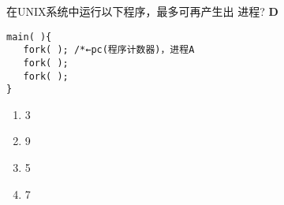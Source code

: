 \begin{problem}
	在UNIX系统中运行以下程序，最多可再产生出 \myline 进程?
	\textbf{D}
	\begin{lstlisting}
main( ){
   fork( ); /*←pc(程序计数器)，进程A
   fork( );
   fork( );
}
	\end{lstlisting}
	\vspace{-0.5em}
	\begin{multicols}{4}
		\begin{enumerate}[label=\Alph*.]
			\item 3
			\item 9
			\item 5
			\item 7
		\end{enumerate}
	\end{multicols}
	\vspace{-1em}
\end{problem}